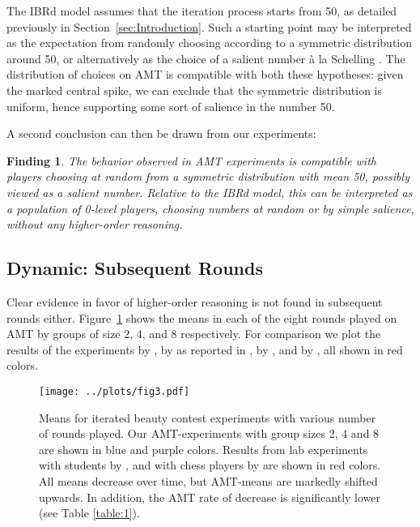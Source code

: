 \documentclass[12pt,review]{elsarticle}
\newtheorem{fdn}{Finding}
\begin{document}

The IBRd model assumes that the iteration process starts from 50,
as detailed previously in Section~\ref{sec:Introduction}. Such a
starting point may be interpreted as the expectation from randomly
choosing according to a symmetric distribution around 50, or alternatively as the
choice of a salient number \`{a} la Schelling \citep{sch60}. The
distribution of choices on AMT is compatible with both these hypotheses:
given the marked central spike, we can exclude that the symmetric
distribution is uniform, hence supporting some sort of salience in
the number 50. 

A second conclusion can then be drawn from our experiments: 

\begin{fdn}
The behavior observed in AMT experiments is compatible with players choosing at random from a symmetric distribution with mean 50, possibly viewed as a salient number. Relative to the IBRd model, this can be interpreted as a population of 0-level players, choosing numbers at random or by simple salience, without any higher-order reasoning.
\end{fdn}

\subsection{Dynamic: Subsequent Rounds\label{subsec:Dynamic:-Subsequent-Rounds}}
\noindent
Clear evidence in favor of higher-order reasoning is not found in subsequent rounds either. Figure~\ref{fig:means} shows the means in each of the eight rounds played on AMT by groups of size 2, 4, and 8 respectively. For comparison we plot the results of the experiments by \citet{Nagel95}, by \citet{Kamm2008unter} as reported in \cite{diekmann2009rational}, by \citet{weber2003learning}, and by \citet{buhren2010chess}, all shown in red colors.

\begin{figure}
\texttt{[image: ../plots/fig3.pdf]}
\caption{Means for iterated beauty contest experiments with various number of rounds played. Our AMT-experiments with group sizes 2, 4 and 8  are shown in blue and purple colors. Results from lab experiments with students by \citet{Nagel95, Kamm2008unter, weber2003learning}, and with chess players by \citet{buhren2010chess} are shown in red colors. All means decrease over time, but AMT-means are markedly shifted upwards. In addition, the AMT rate of decrease is significantly lower (see Table \ref{table:1}).}
\label{fig:means}
\end{figure}
\end{document}
